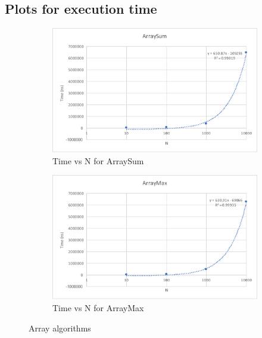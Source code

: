 \documentclass[a4paper,12pt]{article}
\begin{document}
    \subsection{Plots for execution time}
    \begin{figure}[H]
        \begin{subfigure}[t]{0.49\textwidth}
            \centering
            \includegraphics[width=\textwidth]{ArraySum.pdf}
            \caption{Time vs N for ArraySum}
        \end{subfigure}
        \begin{subfigure}[t]{0.49\textwidth}
            \centering
            \includegraphics[width=\textwidth]{ArrayMax.pdf}
            \caption{Time vs N for ArrayMax}
        \end{subfigure}
        \caption{Array algorithms}
    \end{figure}
\end{document}
